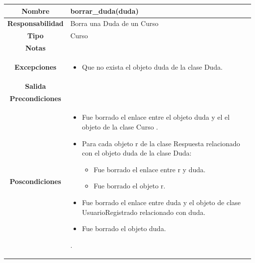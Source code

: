                        \begin{table}[!ht]
\begin{tabular}{|c|m{10cm}|}
\hline\rowcolor{Gray}
{\bf Nombre } & {borrar\_duda(duda)}\\
\hline
{\bf Responsabilidad } & {Borra una Duda de un Curso}\\
\hline
\rowcolor{Gray}
{\bf Tipo } & {Curso} \\
\hline
{\bf Notas } & { } \\
\hline
\rowcolor{Gray}
{\bf Excepciones }& {
\begin{itemize}
\item Que no exista el objeto duda de la clase Duda.
\end{itemize}
} \\
\hline
{\bf Salida }& 
	  { 	
	  } 
 \\
\hline
\rowcolor{Gray}
{\bf Precondiciones }& {
}\\
\hline
{\bf Poscondiciones }& {

\begin{itemize}
\item Fue borrado el enlace entre el objeto duda y el el objeto de la clase Curso .
\item Para cada objeto r de la clase Respuesta relacionado con el objeto duda de la clase Duda:
\begin{itemize}
\item Fue borrado el enlace entre r y duda.
\item Fue borrado el objeto r.
\end{itemize}
\item Fue borrado el enlace entre duda y el objeto de clase UsuarioRegistrado relacionado con duda.
\item Fue borrado el objeto duda.
\end{itemize}

}.
 \\
\hline
\end{tabular}

\end{table}

